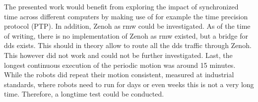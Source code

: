 The presented work would benefit from exploring the impact of synchronized time across different computers by making use of for example the time precision protocol (PTP). In addition, Zenoh as \gls{rmw} could be investigated. As of the time of writing, there is no implementation of Zenoh as \gls{rmw} existed, but a bridge for \gls{dds} exists. This should in theory allow to route all the \gls{dds} traffic through Zenoh. This however did not work and could not be further investigated. Last, the longest continuous execution of the periodic motion was around 15 minutes. While the robots did repeat their motion consistent, measured at industrial standards, where robots need to run for days or even weeks this is not a very long time. Therefore, a longtime test could be conducted.
